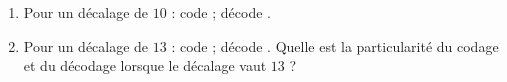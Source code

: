 \documentclass[class=report,crop=false, 12pt]{standalone}
\begin{document}
\begin{activite}
\begin{enumerate}
    
  \begin{enumerate}
    \item Pour un décalage de $10$ : code  ; décode .
    \item Pour un décalage de $13$ : code  ; décode .
    Quelle est la particularité du codage et du décodage lorsque le décalage vaut $13$ ?
  \end{enumerate}  
 
  
\end{enumerate}

\end{activite}
\end{document}
